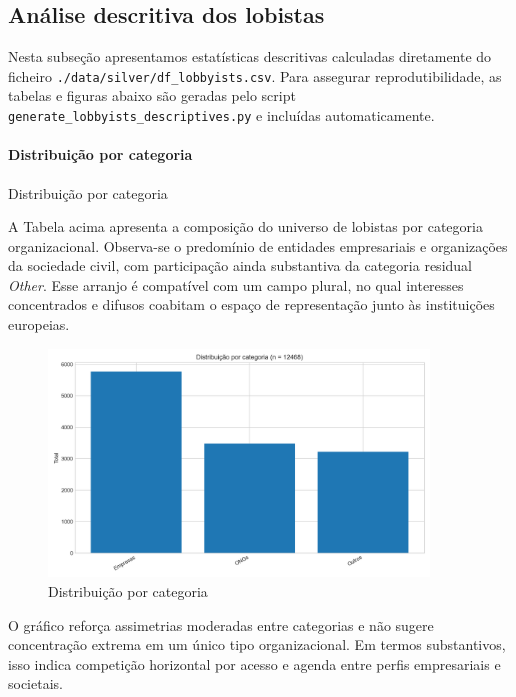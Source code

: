 \subsection{Análise descritiva dos lobistas}
\label{sec:resultados_descritica_lobistas}



Nesta subseção apresentamos estatísticas descritivas calculadas diretamente do ficheiro \texttt{./data/silver/df\_lobbyists.csv}. Para assegurar reprodutibilidade, as tabelas e figuras abaixo são geradas pelo script \texttt{generate\_lobbyists\_descriptives.py} e incluídas automaticamente.

\paragraph{Distribuição por categoria}
\begin{table}[!htbp]
\centering
\caption{Distribuição por categoria}

\end{table}

A Tabela acima apresenta a composição do universo de lobistas por categoria organizacional. Observa-se o predomínio de entidades empresariais e organizações da sociedade civil, com participação ainda substantiva da categoria residual \textit{Other}. Esse arranjo é compatível com um campo plural, no qual interesses concentrados e difusos coabitam o espaço de representação junto às instituições europeias.

\begin{figure}[!htbp]
\centering
\includegraphics[width=0.9\textwidth]{figures/category_distribution.png}
\caption{Distribuição por categoria}
\end{figure}

O gráfico reforça assimetrias moderadas entre categorias e não sugere concentração extrema em um único tipo organizacional. Em termos substantivos, isso indica competição horizontal por acesso e agenda entre perfis empresariais e societais.

